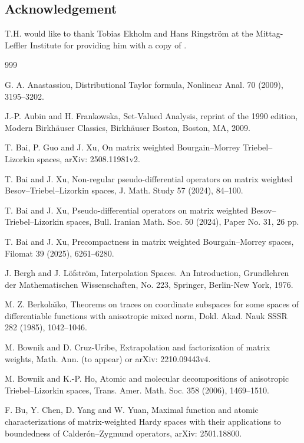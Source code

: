 \documentclass[11pt, reqno]{amsart}
\theoremstyle{definition}
\theoremstyle{remark}
\numberwithin{equation}{section}
\begin{document}
\subsection*{Acknowledgement}

T.H. would like to thank Tobias Ekholm and Hans Ringstr\"om at the Mittag-Leffler Institute for providing him with a copy of \cite{Car}.

\begin{thebibliography}{999}

G. A. Anastassiou,
Distributional Taylor formula,
Nonlinear Anal. 70 (2009), 3195--3202.

J.-P. Aubin and H. Frankowska,
Set-Valued Analysis,
reprint of the 1990 edition,
Modern Birkh\"auser Classics, Birkh\"auser Boston, Boston, MA, 2009.

T. Bai, P. Guo and J. Xu,
On matrix weighted Bourgain--Morrey Triebel--Lizorkin spaces,
arXiv: 2508.11981v2.

T. Bai and J. Xu,
Non-regular pseudo-differential operators on
matrix weighted Besov--Triebel--Lizorkin spaces,
J. Math. Study 57 (2024), 84--100.

T. Bai and J. Xu,
Pseudo-differential operators on
matrix weighted Besov--Triebel--Lizorkin spaces,
Bull. Iranian Math. Soc. 50 (2024), Paper No. 31, 26 pp.

T. Bai and J. Xu,
Precompactness in matrix weighted Bourgain--Morrey spaces,
Filomat 39 (2025), 6261--6280.

J. Bergh and J. L\"ofstr\"om,
Interpolation Spaces. An Introduction,
Grundlehren der Mathematischen Wissenschaften, No. 223,
Springer, Berlin-New York, 1976.

M. Z. Berkola\u\i ko,
Theorems on traces on coordinate subspaces for some spaces
of differentiable functions with anisotropic mixed norm,
Dokl. Akad. Nauk SSSR 282 (1985), 1042--1046.

M. Bownik and D. Cruz-Uribe,
Extrapolation and factorization of matrix weights,
Math. Ann. (to appear) or arXiv: 2210.09443v4.

M. Bownik and K.-P. Ho,
Atomic and molecular decompositions of anisotropic Triebel--Lizorkin spaces,
Trans. Amer. Math. Soc. 358 (2006), 1469--1510.

F. Bu, Y. Chen, D. Yang and W. Yuan,
Maximal function and atomic characterizations of
matrix-weighted Hardy spaces with their applications to
boundedness of Calder\'on--Zygmund operators,
arXiv: 2501.18800.


\end{thebibliography}
\end{document}
